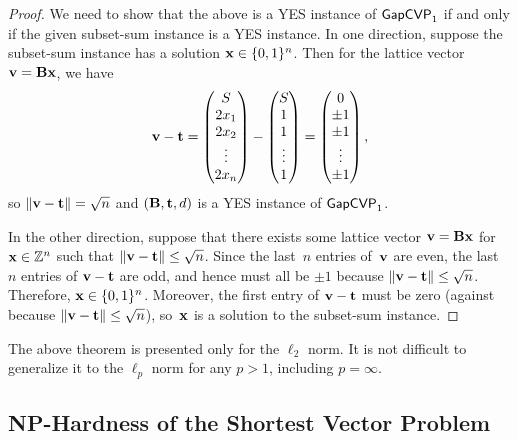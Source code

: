 \documentclass[11pt]{article}
\begin{document}
\begin{proof}
  We need to show that the above is a YES instance of $\mathsf{GapCVP}_{1}$ if
  and only if the given subset-sum instance is a YES instance. In one
  direction, suppose the subset-sum instance has a solution
  $\mathbf{x} \in \{0,1\}^{n}$. Then for the lattice vector
  $\mathbf{v} = \mathbf{B} \mathbf{x}$, we have
  \[ \mathbf{v} - \mathbf{t} =
    \begin{pmatrix}
      S \\
      2x_1 \\
      2x_2 \\
      \vdots \\
      2x_n
    \end{pmatrix} -
    \begin{pmatrix}
      S \\
      1 \\
      1 \\
      \vdots \\
      1
    \end{pmatrix} =
    \begin{pmatrix}
      0 \\
      \pm 1 \\
      \pm 1 \\
      \vdots \\
      \pm 1
    \end{pmatrix}, \]
  so $\lVert\mathbf{v} - \mathbf{t}\rVert = \sqrt{n}$ and
  $(\mathbf{B}, \mathbf{t}, d)$ is a YES instance of $\mathsf{GapCVP}_{1}$.

  In the other direction, suppose that there exists some lattice
  vector $\mathbf{v} = \mathbf{B} \mathbf{x}$ for $\mathbf{x} \in \mathbb{Z}^{n}$ such that
  $\lVert\mathbf{v} - \mathbf{t}\rVert \leq \sqrt{n}$. Since the last~$n$ entries
  of~$\mathbf{v}$ are even, the last~$n$ entries of $\mathbf{v}-\mathbf{t}$ are odd,
  and hence must all be $\pm 1$ because
  $\lVert\mathbf{v}-\mathbf{t}\rVert \leq \sqrt{n}$. Therefore,
  $\mathbf{x} \in \{0,1\}^{n}$. Moreover, the first entry of $\mathbf{v}-\mathbf{t}$
  must be zero (against because $\lVert\mathbf{v}-\mathbf{t}\rVert \leq \sqrt{n}$),
  so~$\mathbf{x}$ is a solution to the subset-sum instance.
\end{proof}

The above theorem is presented only for the $\ell_2$ norm. It is not
difficult to generalize it to the $\ell_p$ norm for any $p > 1$,
including $p = \infty$.

\subsection{NP-Hardness of the Shortest Vector Problem}
\label{sec:np-hardness-svpinfty}
\end{document}
